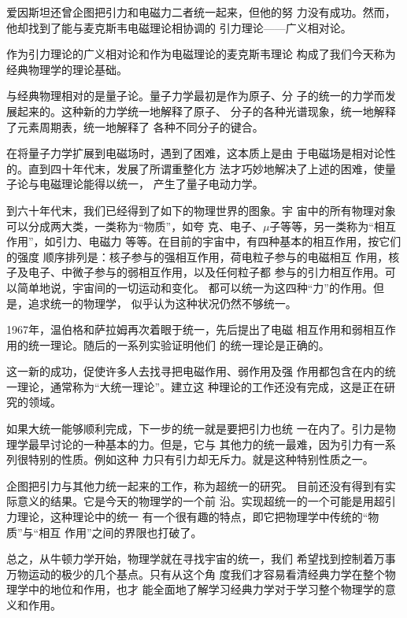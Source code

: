 爱因斯坦还曾企图把引力和电磁力二者统一起来，但他的努
力没有成功。然而，他却找到了能与麦克斯韦电磁理论相协调的
引力理论——广义相对论。

作为引力理论的广义相对论和作为电磁理论的麦克斯韦理论
构成了我们今天称为经典物理学的理论基础。

与经典物理相对的是量子论。量子力学最初是作为原子、分
子的统一的力学而发展起来的。这种新的力学统一地解释了原子、
分子的各种光谱现象，统一地解释了元素周期表，统一地解释了
各种不同分子的键合。

在将量子力学扩展到电磁场时，遇到了困难，这本质上是由
于电磁场是相对论性的。直到四十年代末，发展了所谓重整化方
法才巧妙地解决了上述的困难，使量子论与电磁理论能得以统一，
产生了量子电动力学。

到六十年代末，我们已经得到了如下的物理世界的图象。宇
宙中的所有物理对象可以分成两大类，一类称为“物质”，如夸
克、电子、\mu $\mu$子等等，另一类称为“相互作用”，如引力、电磁力
等等。在目前的宇宙中，有四种基本的相互作用，按它们的强度
顺序排列是：核子参与的强相互作用，荷电粒子参与的电磁相互
作用，核子及电子、中微子参与的弱相互作用，以及任何粒子都
参与的引力相互作用。可以简单地说，宇宙间的一切运动和变化。
都可以统一为这四种“力”的作用。但是，追求统一的物理学，
似乎认为这种状况仍然不够统一。

1967年，温伯格和萨拉姆再次着眼于统一，先后提出了电磁
相互作用和弱相互作用的统一理论。随后的一系列实验证明他们
的统一理论是正确的。

这一新的成功，促使许多人去找寻把电磁作用、弱作用及强
作用都包含在内的统一理论，通常称为“大统一理论”。建立这
种理论的工作还没有完成，这是正在研究的领域。

如果大统一能够顺利完成，下一步的统一就是要把引力也统
一在内了。引力是物理学最早讨论的一种基本的力。但是，它与
其他力的统一最难，因为引力有一系列很特别的性质。例如这种
力只有引力却无斥力。就是这种特别性质之一。

企图把引力与其他力统一起来的工作，称为超统一的研究。
目前还没有得到有实际意义的结果。它是今天的物理学的一个前
沿。实现超统一的一个可能是用超引力理论，这种理论中的统一
有一个很有趣的特点，即它把物理学中传统的“物质”与“相互
作用”之间的界限也打破了。

总之，从牛顿力学开始，物理学就在寻找宇宙的统一，我们
希望找到控制着万事万物运动的极少的几个基点。只有从这个角
度我们才容易看清经典力学在整个物理学中的地位和作用，也才
能全面地了解学习经典力学对于学习整个物理学的意义和作用。
